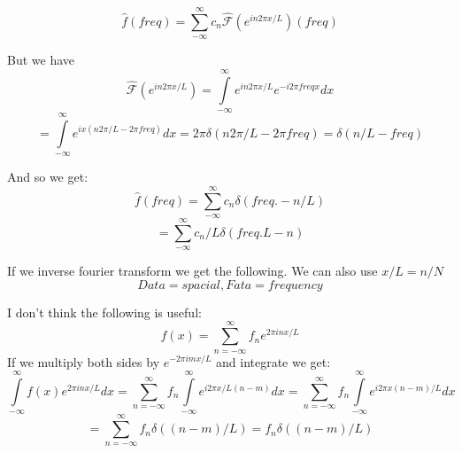 \documentclass[a4paper,12pt]{report}
\begin{document}
$$\hat f (freq) = \sum\limits_{-\infty}^{\infty} c_n \mathscr{\hat F}(e^{i n 2 \pi x/L})(freq)$$ 

But we have $$\mathscr{\hat F}(e^{i n 2 \pi x/L}) = \int\limits_{-\infty}^\infty e^{i n 2 \pi x/L}e^{-i 2\pi freq x} dx $$
$$= \int\limits_{-\infty}^\infty e^{i x (n 2 \pi /L - 2\pi freq )}dx = 2\pi \delta (n 2\pi/L -2\pi freq)= \delta (n /L - freq)$$

And so we get:
$$\hat f (freq) = \sum\limits_{-\infty}^{\infty} c_n \delta(freq.- n/L)$$
$$= \sum\limits_{-\infty}^{\infty} c_n /L \delta(freq. L- n)$$

If we inverse fourier transform we get the following.
We can also use $x/L=n/N$
$$Data = spacial,  Fata=frequency$$


I don’t think the following is useful:
$$f(x)= \sum\limits_{n=-\infty}^\infty f_n e^{2\pi i n x/L} $$
If we multiply both sides by $e^{-2\pi i m x/L}$ and integrate we get:
$$\int \limits_{-\infty}^\infty f(x)e^{2\pi i n x/L} dx = \sum\limits_{n=-\infty}^\infty  f_n  \int \limits_{-\infty}^\infty  e^{i 2 \pi x/L (n-m)} dx  =  \sum\limits_{n=-\infty}^\infty  f_n  \int \limits_{-\infty}^\infty  e^{i 2 \pi x (n-m)/L} dx  $$
$$=  \sum\limits_{n=-\infty}^\infty  f_n \delta((n-m)/L) = f_n \delta((n-m)/L)$$
\fi
\end{document}

